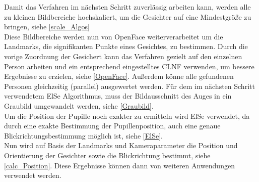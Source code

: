 Damit das Verfahren im nächsten Schritt zuverlässig arbeiten kann, werden alle zu kleinen Bildbereiche hochskaliert, um die Gesichter auf eine Mindestgröße zu bringen, siehe \autoref{scale_Algos}\\
Diese Bildbereiche werden nun von OpenFace weiterverarbeitet um die Landmarks, die signifikanten Punkte eines Gesichtes, zu bestimmen. Durch die vorige Zuordnung der Gesichert kann das Verfahren gezielt auf den einzelnen Person arbeiten und ein entsprechend eingestelltes CLNF verwenden, um bessere Ergebnisse zu erzielen, siehe \autoref{OpenFace}. Außerdem könne alle gefundenen Personen gleichzeitig (parallel) ausgewertet werden. Für dem im nächsten Schritt verwendetem ElSe Algorithmus, muss der Bildausschnitt des Auges in ein Graubild umgewandelt werden, siehe \autoref{Graubild}.\\
Um die Position der Pupille noch exakter zu ermitteln wird ElSe verwendet, da durch eine exakte Bestimmung der Pupillenposition, auch eine genaue Blickrichtungsbestimmung möglich ist, siehe \autoref{ElSe}.\\
Nun wird auf Basis der Landmarks und Kameraparameter die Position und Orientierung der Gesichter sowie die Blickrichtung bestimmt, siehe \autoref{calc_Position}. Diese Ergebnisse können dann von weiteren Anwendungen verwendet werden.